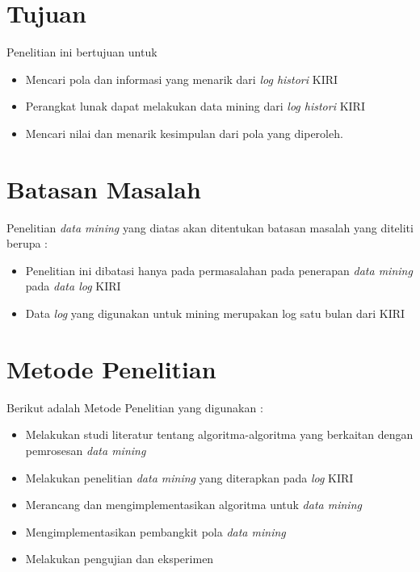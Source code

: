 \section{Tujuan}
Penelitian ini bertujuan untuk 
\begin{itemize}
	\item Mencari pola dan informasi yang menarik dari \textsl{log histori} KIRI
	\item Perangkat lunak dapat melakukan data mining dari \textsl{log histori} KIRI
	\item Mencari nilai dan menarik kesimpulan dari pola yang diperoleh.
\end{itemize}

\section{Batasan Masalah}
Penelitian \textsl{data mining} yang diatas akan ditentukan batasan masalah yang diteliti berupa : 
\begin{itemize}
	\item Penelitian ini dibatasi hanya pada permasalahan pada penerapan \textsl{data mining} pada \textsl{data log} KIRI
	\item Data \textsl{log} yang digunakan untuk mining merupakan log satu bulan dari KIRI
\end{itemize}

\section{Metode Penelitian}
Berikut adalah Metode Penelitian yang digunakan : 
	\begin{itemize}
		\item Melakukan studi literatur tentang algoritma-algoritma yang berkaitan dengan pemrosesan \textsl{data mining}
		\item Melakukan penelitian \textsl{data mining} yang diterapkan pada \textsl{log} KIRI
		\item Merancang dan mengimplementasikan algoritma untuk \textsl{data mining}
		\item Mengimplementasikan pembangkit pola \textsl{data mining}
		\item Melakukan pengujian dan eksperimen
	\end{itemize}

